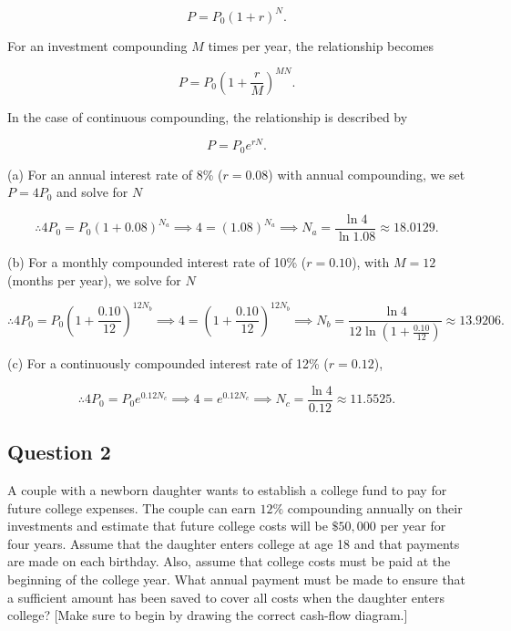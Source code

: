 \documentclass[12pt]{article}
\begin{document}
\[
P = P_0(1 + r)^N.
\]

For an investment compounding \( M \) times per year, the relationship becomes

\[
P = P_0\left(1 + \frac{r}{M}\right)^{MN}.
\]

In the case of continuous compounding, the relationship is described by

\[
P = P_0 e^{rN}.
\]

(a) For an annual interest rate of 8\% (\( r = 0.08 \)) with annual compounding, we set \( P = 4P_0 \) and solve for \( N \)

\[
\therefore 4P_0 = P_0(1 + 0.08)^{N_a} \implies 4 = (1.08)^{N_a} \implies N_a = \frac{\ln 4}{\ln 1.08} \approx 18.0129.
\]

(b) For a monthly compounded interest rate of 10\% (\( r = 0.10 \)), with \( M = 12 \) (months per year), we solve for \( N \)

\[
\therefore 4P_0 = P_0\left(1 + \frac{0.10}{12}\right)^{12N_b} \implies 4 = \left(1 + \frac{0.10}{12}\right)^{12N_b} \implies N_b = \frac{\ln 4}{12 \ln \left(1 + \frac{0.10}{12}\right)} \approx 13.9206.
\]

(c) For a continuously compounded interest rate of 12\% (\( r = 0.12 \)),

\[
\therefore 4P_0 = P_0 e^{0.12N_c} \implies 4 = e^{0.12N_c} \implies N_c = \frac{\ln 4}{0.12} \approx 11.5525.
\]

\newpage
\subsection*{Question 2}
\begin{q}
A couple with a newborn daughter wants to establish a college fund to pay for future college expenses. The couple can earn \(12 \%\) compounding annually on their investments and estimate that future college costs will be \(\$ 50,000\) per year for four years. Assume that the daughter enters college at age 18 and that payments are made on each birthday. Also, assume that college costs must be paid at the beginning of the college year. What annual payment must be made to ensure that a sufficient amount has been saved to cover all costs when the daughter enters college? [Make sure to begin by drawing the correct cash-flow diagram.]
\end{q}
\end{document}
